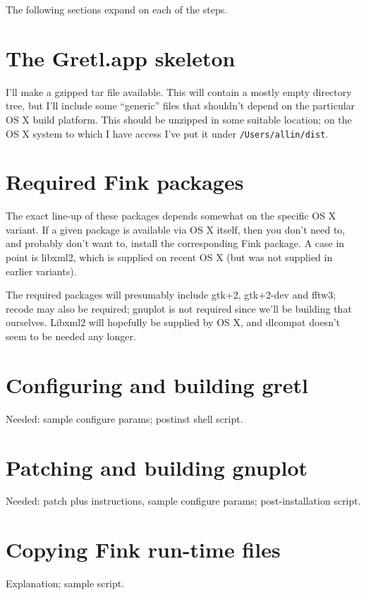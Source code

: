 \documentclass{article}
\begin{document}
The following sections expand on each of the steps.

\section{The Gretl.app skeleton}

I'll make a gzipped tar file available.  This will contain a mostly
empty directory tree, but I'll include some ``generic'' files that
shouldn't depend on the particular OS X build platform.  This should
be unzipped in some suitable location; on the OS X system to which I
have access I've put it under \texttt{/Users/allin/dist}.

\section{Required Fink packages}

The exact line-up of these packages depends somewhat on the specific
OS X variant.  If a given package is available via OS X itself, then
you don't need to, and probably don't want to, install the
corresponding Fink package.  A case in point is libxml2, which is
supplied on recent OS X (but was not supplied in earlier variants).

The required packages will presumably include gtk+2, gtk+2-dev and
fftw3;  recode may also be required; gnuplot is not required since
we'll be building that ourselves.  Libxml2 will hopefully be supplied
by OS X, and dlcompat doesn't seem to be needed any longer.

\section{Configuring and building gretl}

Needed: sample configure params; postinst shell script.


\section{Patching and building gnuplot}

Needed: patch plus instructions, sample configure params;
post-installation script.

\section{Copying Fink run-time files}

Explanation; sample script.
\end{document}
